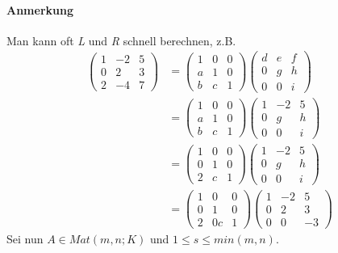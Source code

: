 \documentclass[11pt]{report}
\begin{document}
\paragraph{Anmerkung}
Man kann oft \textit{L} und \textit{R} schnell berechnen, z.B.
\begin{align}
 \begin{pmatrix} 1 & -2 & 5 \\ 0 & 2 & 3 \\ 2 & -4 & 7 \end{pmatrix} &= \begin{pmatrix} 1 & 0 & 0 \\ a & 1 & 0 \\ b & c & 1 \end{pmatrix} \begin{pmatrix} d & e & f \\ 0 & g & h \\ 0 & 0 & i \end{pmatrix} \\
&= \begin{pmatrix} 1 & 0 & 0 \\ a & 1 & 0 \\ b & c & 1 \end{pmatrix} \begin{pmatrix} 1 & -2 & 5 \\ 0 & g & h \\ 0 & 0 & i \end{pmatrix} \\
&= \begin{pmatrix} 1 & 0 & 0 \\ 0 & 1 & 0 \\ 2 & c & 1 \end{pmatrix} \begin{pmatrix} 1 & -2 & 5 \\ 0 & g & h \\ 0 & 0 & i \end{pmatrix} \\
&= \begin{pmatrix} 1 & 0 & 0 \\ 0 & 1 & 0 \\ 2 &0c & 1 \end{pmatrix} \begin{pmatrix} 1 & -2 & 5 \\ 0 & 2 & 3 \\ 0 & 0 & -3 \end{pmatrix}
\end{align}
Sei nun $A \in Mat(m,n; K)$ und $1 \leq s \leq min(m,n)$. \\
\end{document}
